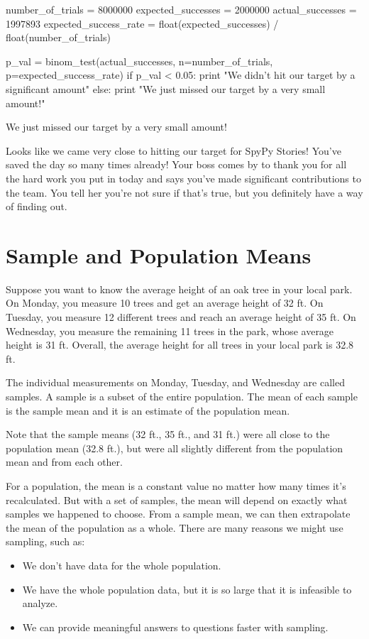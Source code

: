 \documentclass{journal}
\begin{document}
number_of_trials = 8000000
expected_successes = 2000000
actual_successes = 1997893
expected_success_rate = float(expected_successes) / float(number_of_trials)

p_val = binom_test(actual_successes, n=number_of_trials, p=expected_success_rate)
if p_val < 0.05:
    print "We didn't hit our target by a significant amount"
else:
    print "We just missed our target by a very small amount!"

We just missed our target by a very small amount!

Looks like we came very close to hitting our target for SpyPy Stories! You've saved the day so many times already! Your boss comes by to thank you for all the hard work you put in today and says you've made significant contributions to the team. You tell her you're not sure if that's true, but you definitely have a way of finding out.


\section{Sample and Population Means}

Suppose you want to know the average height of an oak tree in your local park. On Monday, you measure 10 trees and get an average height of 32 ft. On Tuesday, you measure 12 different trees and reach an average height of 35 ft. On Wednesday, you measure the remaining 11 trees in the park, whose average height is 31 ft. Overall, the average height for all trees in your local park is 32.8 ft.


The individual measurements on Monday, Tuesday, and Wednesday are called samples. A sample is a subset of the entire population. The mean of each sample is the sample mean and it is an estimate of the population mean.



Note that the sample means (32 ft., 35 ft., and 31 ft.) were all close to the population mean (32.8 ft.), but were all slightly different from the population mean and from each other.


For a population, the mean is a constant value no matter how many times it's recalculated. But with a set of samples, the mean will depend on exactly what samples we happened to choose. From a sample mean, we can then extrapolate the mean of the population as a whole. There are many reasons we might use sampling, such as:

\begin{itemize}
	\item We don't have data for the whole population.
	\item We have the whole population data, but it is so large that it is infeasible to analyze.
	\item We can provide meaningful answers to questions faster with sampling.
\end{itemize}
\end{document}
